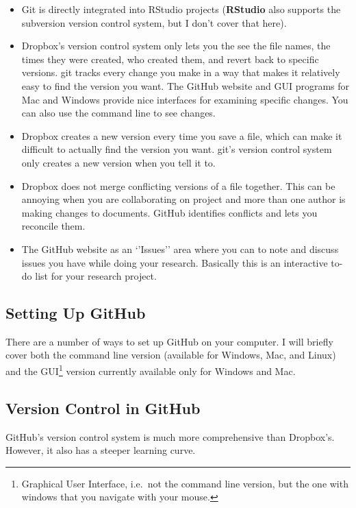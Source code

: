\documentclass[ChapterTOCs,krantz1]{krantz}\usepackage{graphicx, color}
\begin{document}
\begin{itemize}
\item
  Git is directly integrated into RStudio projects
  (\textbf{RStudio} also supports the subversion version
  control system, but I don't cover that here).
\item
  Dropbox's version control system only lets you the see the
  file names, the times they were created, who created them, and revert
  back to specific versions. git tracks every change you make
  in a way that makes it relatively easy to find the version you want.
  The GitHub website and GUI programs for Mac and Windows
  provide nice interfaces for examining specific changes. You can also
  use the command line to see changes.
\item
  Dropbox creates a new version every time you save a file,
  which can make it difficult to actually find the version you want.
  git's version control system only creates a new version when
  you tell it to.
\item
  Dropbox does not merge conflicting versions of a file
  together. This can be annoying when you are collaborating on project
  and more than one author is making changes to documents.
  GitHub identifies conflicts and lets you reconcile them.
\item
  The GitHub website as an `'Issues'' area where you can to
  note and discuss issues you have while doing your research. Basically
  this is an interactive to-do list for your research project.
\end{itemize}

\subsection{Setting Up GitHub}

There are a number of ways to set up GitHub on your computer. I
will briefly cover both the command line version (available for Windows,
Mac, and Linux) and the GUI\footnote{Graphical User Interface, i.e.~not
  the command line version, but the one with windows that you navigate
  with your mouse.} version currently available only for Windows and
Mac.

\subsection{Version Control in GitHub}

GitHub's version control system is much more comprehensive than Dropbox's. However, it also has a steeper learning curve.
\end{document}
